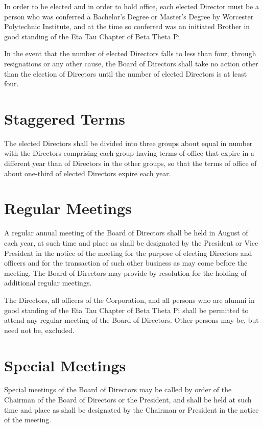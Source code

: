 In order to be elected and in order to hold office, each elected Director must
be a person who was conferred a Bachelor's Degree or Master's Degree by
Worcester Polytechnic Institute, and at the time so conferred was an initiated
Brother in good standing of the Eta Tau Chapter of Beta Theta Pi.

In the event that the number of elected Directors falls to less than four,
through resignations or any other cause, the Board of Directors shall take no
action other than the election of Directors until the number of elected
Directors is at least four.

\section{Staggered Terms}

The elected Directors shall be divided into three groups about equal in number
with the Directors comprising each group having terms of office that expire in a
different year than of Directors in the other groups, so that the terms of
office of about one-third of elected Directors expire each year.

\section{Regular Meetings}

A regular annual meeting of the Board of Directors shall be held in August of
each year, at such time and place as shall be designated by the President or
Vice President in the notice of the meeting for the purpose of electing
Directors and officers and for the transaction of such other business as may
come before the meeting.  The Board of Directors may provide by resolution for
the holding of additional regular meetings.

The Directors, all officers of the Corporation, and all persons who are alumni
in good standing of the Eta Tau Chapter of Beta Theta Pi shall be
permitted to attend any regular meeting of the Board of Directors.  Other
persons may be, but need not be, excluded.

\section{Special Meetings}

Special meetings of the Board of Directors may be called by order of the
Chairman of the Board of Directors or the President, and shall be held at such
time and place as shall be designated by the Chairman or President in the notice
of the meeting.

